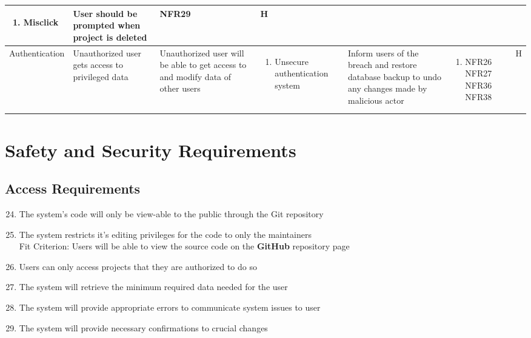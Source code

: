 \documentclass{article}
\begin{document}
\begin{longtable}{ | l | p{2.5cm} | p{3cm} | p{3cm} | p{3.5cm} | p{1.5cm} | c | }
\begin{enumerate}[leftmargin=*]
				\item Misclick
			\end{enumerate}
			&
			User should be prompted when project is deleted
			& NFR29 & H\thecomponentNum-2\\
			\hline
			Authentication & Unauthorized user gets access to privileged data & Unauthorized user will be able to get access to and modify data of other users &
			\begin{enumerate}[leftmargin=*]
				\item Unsecure authentication system
			\end{enumerate} 
			&
			Inform users of the breach and restore database backup to undo any changes made by malicious actor
			&
			\begin{enumerate}[leftmargin=*]
				\item [] NFR26 NFR27 NFR36 NFR38
			\end{enumerate} 
			& H\newComponent-1\\
			\hline
		\end{longtable}
	\restoregeometry
	
	
	
	\section{Safety and Security Requirements}
	
	
	\subsection{Access Requirements}
	\begin{enumerate}[{NFR}1.]
		\setcounter{enumi}{23}
		\item The system’s code will only be view-able to the public through the Git repository
		\item The system restricts it's editing privileges for the code to only the maintainers\\
		{\color{red}Fit Criterion: Users will be able to view the source code on the \textbf{GitHub} repository page}
		\item Users can only access projects that they are authorized to do so
		\item The system will retrieve the minimum required data needed for the user
		\item The system will provide appropriate errors to communicate system issues to user
		\item The system will provide necessary confirmations to crucial changes
	\end{enumerate}
	
\end{document}
